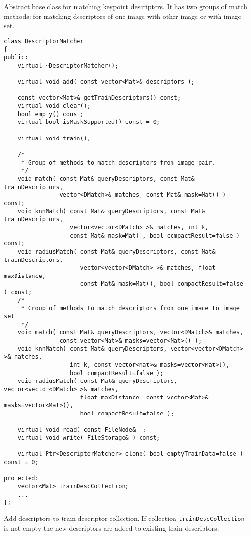Abstract base class for matching keypoint descriptors. It has two groups 
of match methods: for matching descriptors of one image with other image or
with image set.

\begin{lstlisting}
class DescriptorMatcher
{
public:
    virtual ~DescriptorMatcher();

    virtual void add( const vector<Mat>& descriptors );

    const vector<Mat>& getTrainDescriptors() const;
    virtual void clear();
    bool empty() const;
    virtual bool isMaskSupported() const = 0;

    virtual void train();
    
    /*
     * Group of methods to match descriptors from image pair.
     */
    void match( const Mat& queryDescriptors, const Mat& trainDescriptors,
                vector<DMatch>& matches, const Mat& mask=Mat() ) const;
    void knnMatch( const Mat& queryDescriptors, const Mat& trainDescriptors,
                   vector<vector<DMatch> >& matches, int k,
                   const Mat& mask=Mat(), bool compactResult=false ) const;
    void radiusMatch( const Mat& queryDescriptors, const Mat& trainDescriptors,
                      vector<vector<DMatch> >& matches, float maxDistance,
                      const Mat& mask=Mat(), bool compactResult=false ) const;
    /*
     * Group of methods to match descriptors from one image to image set.
     */
    void match( const Mat& queryDescriptors, vector<DMatch>& matches,
                const vector<Mat>& masks=vector<Mat>() );
    void knnMatch( const Mat& queryDescriptors, vector<vector<DMatch> >& matches, 
                   int k, const vector<Mat>& masks=vector<Mat>(), 
                   bool compactResult=false );
    void radiusMatch( const Mat& queryDescriptors, vector<vector<DMatch> >& matches, 
                      float maxDistance, const vector<Mat>& masks=vector<Mat>(), 
                      bool compactResult=false );

    virtual void read( const FileNode& );
    virtual void write( FileStorage& ) const;

    virtual Ptr<DescriptorMatcher> clone( bool emptyTrainData=false ) const = 0;

protected:
    vector<Mat> trainDescCollection; 
    ...
};
\end{lstlisting} 

Add descriptors to train descriptor collection. If collection \texttt{trainDescCollection} is not empty
the new descriptors are added to existing train descriptors.

